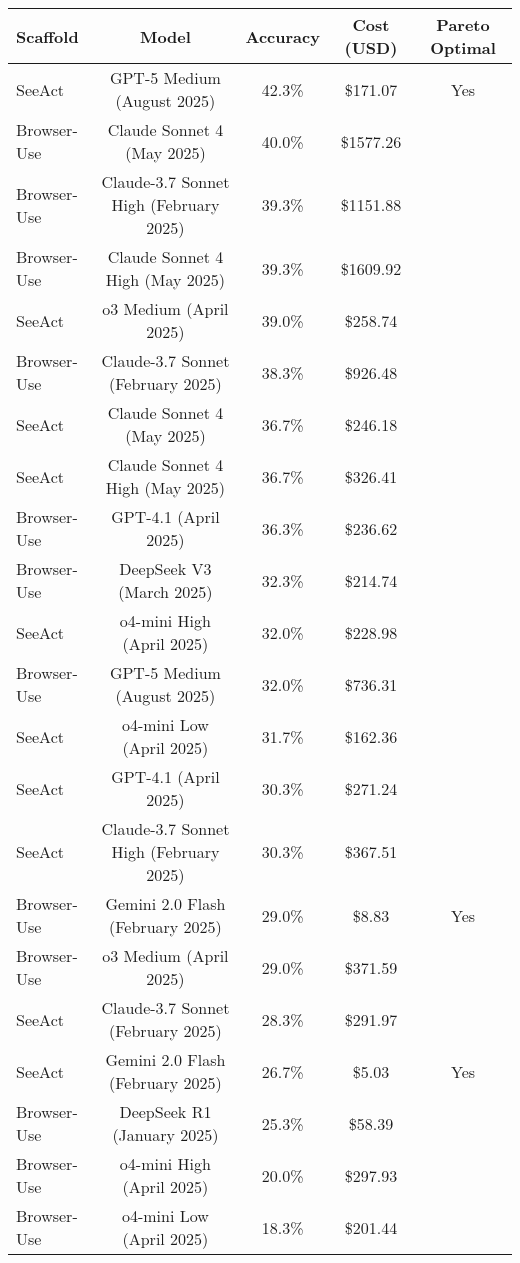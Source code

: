 \begin{tabular}{lcccc}
\toprule
Scaffold & Model & Accuracy & Cost (USD) & Pareto Optimal \\
\midrule
SeeAct & GPT-5 Medium (August 2025) & 42.3\% & \$171.07 & Yes \\
Browser-Use & Claude Sonnet 4 (May 2025) & 40.0\% & \$1577.26 &  \\
Browser-Use & Claude-3.7 Sonnet High (February 2025) & 39.3\% & \$1151.88 &  \\
Browser-Use & Claude Sonnet 4 High (May 2025) & 39.3\% & \$1609.92 &  \\
SeeAct & o3 Medium (April 2025) & 39.0\% & \$258.74 &  \\
Browser-Use & Claude-3.7 Sonnet (February 2025) & 38.3\% & \$926.48 &  \\
SeeAct & Claude Sonnet 4 (May 2025) & 36.7\% & \$246.18 &  \\
SeeAct & Claude Sonnet 4 High (May 2025) & 36.7\% & \$326.41 &  \\
Browser-Use & GPT-4.1 (April 2025) & 36.3\% & \$236.62 &  \\
Browser-Use & DeepSeek V3 (March 2025) & 32.3\% & \$214.74 &  \\
SeeAct & o4-mini High (April 2025) & 32.0\% & \$228.98 &  \\
Browser-Use & GPT-5 Medium (August 2025) & 32.0\% & \$736.31 &  \\
SeeAct & o4-mini Low (April 2025) & 31.7\% & \$162.36 &  \\
SeeAct & GPT-4.1 (April 2025) & 30.3\% & \$271.24 &  \\
SeeAct & Claude-3.7 Sonnet High (February 2025) & 30.3\% & \$367.51 &  \\
Browser-Use & Gemini 2.0 Flash (February 2025) & 29.0\% & \$8.83 & Yes \\
Browser-Use & o3 Medium (April 2025) & 29.0\% & \$371.59 &  \\
SeeAct & Claude-3.7 Sonnet (February 2025) & 28.3\% & \$291.97 &  \\
SeeAct & Gemini 2.0 Flash (February 2025) & 26.7\% & \$5.03 & Yes \\
Browser-Use & DeepSeek R1 (January 2025) & 25.3\% & \$58.39 &  \\
Browser-Use & o4-mini High (April 2025) & 20.0\% & \$297.93 &  \\
Browser-Use & o4-mini Low (April 2025) & 18.3\% & \$201.44 &  \\
\bottomrule
\end{tabular}